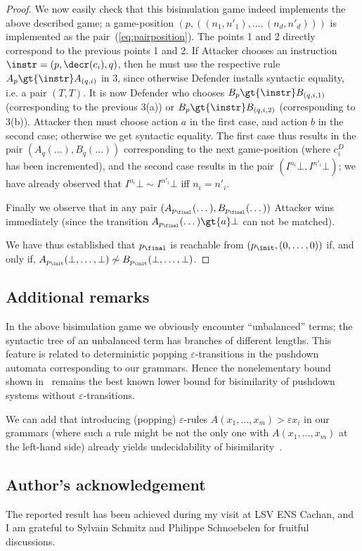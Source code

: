 \documentclass[a4paper,11pt]{article}
\begin{document}
\begin{proof}
We now easily check that this bisimulation game indeed implements the
above described game; a game-position  
$(p,((n_1,n'_1),\dots,(n_d,n'_d)))$ is implemented as the
pair~(\ref{eq:pairposition}). The points 1 and 2 directly correspond
to the previous points 1 and 2.
If Attacker chooses an instruction $\instr=(p,\decr(c_i),q)$, 
then he
must use the respective rule $A_p\gt{\instr}A_{(q,i)}$ in 3, since
otherwise Defender installs syntactic equality, i.e. a pair $(T,T)$.
It is now Defender who chooses $B_p\gt{\instr}B_{(q,i,1)}$ (corresponding
to the previous 3(a)) or $B_p\gt{\instr}B_{(q,i,2)}$ (corresponding
to 3(b)). Attacker then must
choose action $a$ in the first case, and action $b$ in the second
case; otherwise we get syntactic equality.
The first case thus results in the pair 
$(A_q(\dots), B_q(\dots))$ corresponding to the next game-position
(where $c_i^D$ has been incremented), and the second case results in
the pair $(I^{n_i}\bot, I^{n'_i}\bot)$; we have already observed that 
$I^{n_i}\bot\sim I^{n'_i}\bot$ iff $n_i=n'_i$.

Finally we observe that in any pair 
$(A_{p_{\final}}(\dots), B_{p_\final}(\dots))$ Attacker wins immediately
(since the transition $A_{p_\final}(\dots)\gt{a}\bot$ can not be
matched).

We have thus established that $p_\final$ is reachable from
$(p_\init, (0,\dots,0))$ if, and only if, 
$A_{p_\init}(\bot,\dots,\bot)\not\sim
B_{p_\init}(\bot,\dots,\bot)$.
\end{proof}

\subsection*{Additional remarks}

In the above bisimulation game we obviously encounter ``unbalanced'' terms; 
the syntactic tree of an unbalanced term has branches of different lengths. 
This feature is related to deterministic popping
$\varepsilon$-transitions in the pushdown automata corresponding to
our grammars.
Hence the nonelementary bound shown in~\cite{BGKM12} remains
the best known lower bound for bisimilarity of pushdown systems
without $\varepsilon$-transitions.


We can add that introducing (popping) $\varepsilon$-rules
$A(x_1,\dots,x_m)\gt{\varepsilon}x_i$ in our grammars (where such a
rule might be not the only one with $A(x_1,\dots,x_m)$ at the
left-hand side) already yields undecidability of
bisimilarity~\cite{DBLP:journals/jacm/JancarS08}.

\subsection*{Author's acknowledgement}

The reported result has been achieved during my visit at LSV ENS
Cachan, and 
I am grateful to Sylvain Schmitz and Philippe Schnoebelen for
fruitful discussions.





\end{document}
